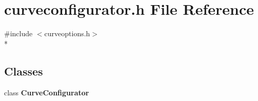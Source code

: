 \section{curveconfigurator.\+h File Reference}
\label{curveconfigurator_8h}
{\ttfamily \#include $<$curveoptions.\+h$>$}\\*
\subsection*{Classes}
\begin{DoxyCompactItemize}
\item 
class {\bf Curve\+Configurator}
\end{DoxyCompactItemize}

